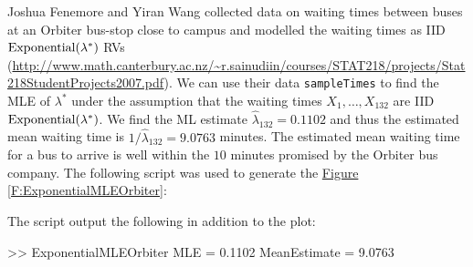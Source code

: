 \begin{labwork}\label{LW:ExponentialMLEOrbiter}
Joshua Fenemore and Yiran Wang collected data on waiting times between buses at an Orbiter bus-stop close to campus and modelled the waiting times as IID $\mbox{{\rm Exponential}}(\lambda^*)$ RVs (\href{http://www.math.canterbury.ac.nz/~r.sainudiin/courses/STAT218/projects/Stat218StudentProjects2007.pdf}{\url{http://www.math.canterbury.ac.nz/~r.sainudiin/courses/STAT218/projects/Stat218StudentProjects2007.pdf}}).  We can use their data {\tt sampleTimes} to find the MLE of $\lambda^*$ under the assumption that the waiting times $X_1,\ldots,X_{132}$ are IID $\mbox{{\rm Exponential}}(\lambda^*)$.  We find the ML estimate $\widehat{\lambda}_{132}=0.1102$ and thus the estimated mean waiting time is $1/\widehat{\lambda}_{132}=9.0763$ minutes.  The estimated mean waiting time for a bus to arrive is well within the $10$ minutes promised by the Orbiter bus company.  The following script was used to generate the \hyperref[F:ExponentialMLEOrbiter]{Figure \ref*{F:ExponentialMLEOrbiter}}:


The script output the following in addition to the plot:
\begin{VrbM}
>> ExponentialMLEOrbiter
MLE =    0.1102
MeanEstimate =    9.0763
\end{VrbM}
\end{labwork}

